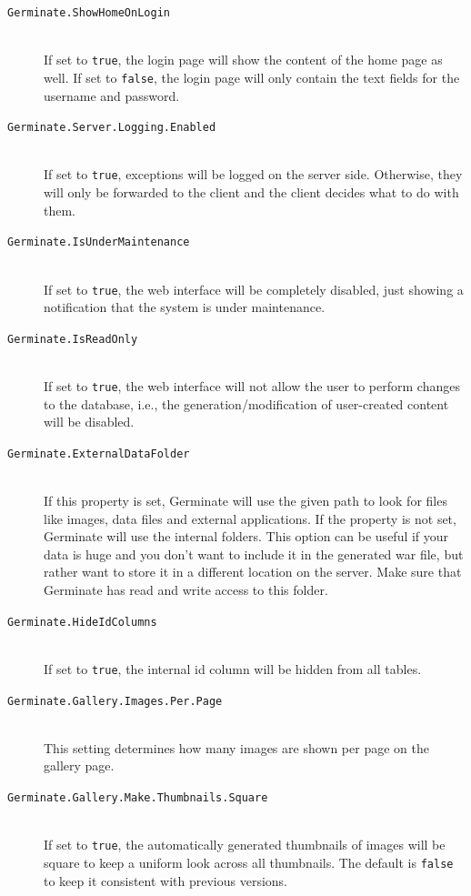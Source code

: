 \begin{description}
    \item[\texttt{Germinate.ShowHomeOnLogin}] \\If set to \texttt{true}, the login page will show the content of the home page as well. If set to \texttt{false}, the login page will only contain the text fields for the username and password.
    \item[\texttt{Germinate.Server.Logging.Enabled}] \\If set to \texttt{true}, exceptions will be logged on the server side. Otherwise, they will only be forwarded to the client and the client decides what to do with them.
    \item[\texttt{Germinate.IsUnderMaintenance}] \\If set to \texttt{true}, the web interface will be completely disabled, just showing a notification that the system is under maintenance.
    \item[\texttt{Germinate.IsReadOnly}] \\If set to \texttt{true}, the web interface will not allow the user to perform changes to the database, i.e., the generation/modification of user-created content will be disabled.
    \item[\texttt{Germinate.ExternalDataFolder}\nonoptionalif] \floatright{[Path]}\\If this property is set, Germinate will use the given path to look for files like images, data files and external applications. If the property is not set, Germinate will use the internal folders. This option can be useful if your data is huge and you don't want to include it in the generated war file, but rather want to store it in a different location on the server. Make sure that Germinate has read and write access to this folder.
    \item[\texttt{Germinate.HideIdColumns}] \\
    If set to \texttt{true}, the internal id column will be hidden from all tables.
    \item[\texttt{Germinate.Gallery.Images.Per.Page}] \\This setting determines how many images are shown per page on the gallery page.
    \item[\texttt{Germinate.Gallery.Make.Thumbnails.Square}] \\If set to \texttt{true}, the automatically generated thumbnails of images will be square to keep a uniform look across all thumbnails. The default is \texttt{false} to keep it consistent with previous versions.

\end{description}
